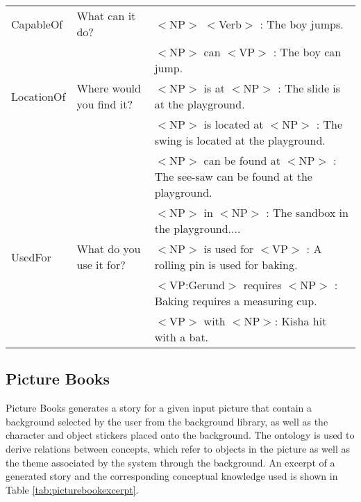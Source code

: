 \begin{table}[p]
\begin{tabular}{|p{2cm}|p{3cm}|p{9cm}|}
CapableOf		& What can it do? & $<$NP$>$ $<$Verb$>$ : The boy jumps. \\
				& & $<$NP$>$ can $<$VP$>$ : The boy can jump. \\ \hline
LocationOf		& Where would you find it? & $<$NP$>$ is at $<$NP$>$ : The slide is at the playground. \\
				& & $<$NP$>$ is located at $<$NP$>$ : The swing is located at the playground. \\
				& & $<$NP$>$ can be found at $<$NP$>$ : The see-saw can be found at the playground. \\
				& & $<$NP$>$ in $<$NP$>$ : The sandbox in the playground.... \\ \hline
UsedFor			& What do you use it for? & $<$NP$>$ is used for $<$VP$>$ : A rolling pin is used for baking. \\
				& & $<$VP:Gerund$>$ requires $<$NP$>$ : Baking requires a measuring cup. \\
				& & $<$VP$>$ with $<$NP$>$: Kisha hit with a bat. \\ \hline
\end{tabular}
\label{tab:reltemplate}
\end{table}

\subsection{Picture Books}
\label{sec:picturebooks}

Picture Books generates a story for a given input picture that contain a background selected by the user from the background library, as well as the character and object stickers placed onto the background. The ontology is used to derive relations between concepts, which refer to objects in the picture as well as the theme associated by the system through the background. An excerpt of a generated story and the corresponding conceptual knowledge used is shown in Table \ref{tab:picturebookexcerpt}.

